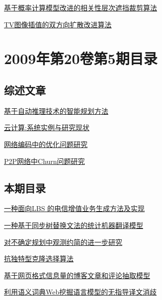 \documentclass[a4paper]{article}
\begin{document}
\href{http://www.jos.org.cn/ch/reader/download_pdf.aspx?file_no=3481&year_id=2009&quarter_id=6&falg=1}{基于概率计算模型改进的相关性层次遮挡裁剪算法}

\href{http://www.jos.org.cn/ch/reader/download_pdf.aspx?file_no=3532&year_id=2009&quarter_id=6&falg=1}{TV图像插值的双方向扩散改进算法}


\section{\textbf{2009年第20卷第5期目录}}
\subsection{综述文章}
\href{http://www.jos.org.cn/ch/reader/download_pdf.aspx?file_no=3468&year_id=2009&quarter_id=5&falg=1}{基于自动推理技术的智能规划方法}

\href{http://www.jos.org.cn/ch/reader/download_pdf.aspx?file_no=3493&year_id=2009&quarter_id=5&falg=1}{云计算:系统实例与研究现状}

\href{http://www.jos.org.cn/ch/reader/download_pdf.aspx?file_no=3503&year_id=2009&quarter_id=5&falg=1}{网络编码中的优化问题研究}

\href{http://www.jos.org.cn/ch/reader/download_pdf.aspx?file_no=3485&year_id=2009&quarter_id=5&falg=1}{P2P网络中Churn问题研究}

\subsection{本期目录}
\href{http://www.jos.org.cn/ch/reader/download_pdf.aspx?file_no=3192&year_id=2009&quarter_id=5&falg=1}{一种面向LBS 的电信增值业务生成方法及实现}

\href{http://www.jos.org.cn/ch/reader/download_pdf.aspx?file_no=3409&year_id=2009&quarter_id=5&falg=1}{一种基于同步树替换文法的统计机器翻译模型}

\href{http://www.jos.org.cn/ch/reader/download_pdf.aspx?file_no=3453&year_id=2009&quarter_id=5&falg=1}{对不确定规划中观测约简的进一步研究}

\href{http://www.jos.org.cn/ch/reader/download_pdf.aspx?file_no=3266&year_id=2009&quarter_id=5&falg=1}{抗独特型克隆选择算法}

\href{http://www.jos.org.cn/ch/reader/download_pdf.aspx?file_no=3283&year_id=2009&quarter_id=5&falg=1}{基于网页格式信息量的博客文章和评论抽取模型}

\href{http://www.jos.org.cn/ch/reader/download_pdf.aspx?file_no=3367&year_id=2009&quarter_id=5&falg=1}{利用语义词典Web挖掘语言模型的无指导译文消歧}
\end{document}
